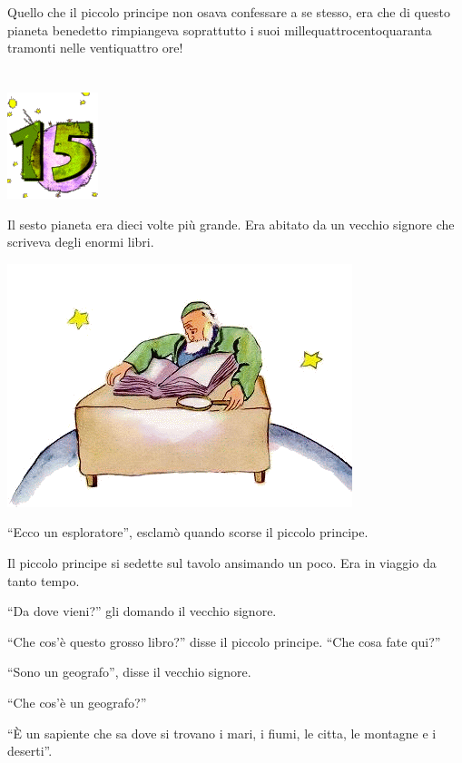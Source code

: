 \documentclass[11pt]{scrbook}
\begin{document}
Quello che il piccolo principe non osava confessare a se stesso, era che di questo pianeta benedetto rimpiangeva soprattutto i suoi millequattrocentoquaranta tramonti nelle ventiquattro ore!

\chapter{}
\begin{center}
\includegraphics{img/chapter15}
\end{center}

Il sesto pianeta era dieci volte più grande. Era abitato da un vecchio signore che scriveva degli enormi libri.

\begin{center}
\includegraphics{img/15a}
\end{center}

``Ecco un esploratore'', esclamò quando scorse il piccolo principe.

Il piccolo principe si sedette sul tavolo ansimando un poco. Era in viaggio da tanto tempo.

``Da dove vieni?'' gli domando il vecchio signore.

``Che cos'è questo grosso libro?'' disse il piccolo principe. ``Che cosa fate qui?''

``Sono un geografo'', disse il vecchio signore.

``Che cos'è un geografo?''

``È un sapiente che sa dove si trovano i mari, i fiumi, le citta, le montagne e i deserti''.
\end{document}
